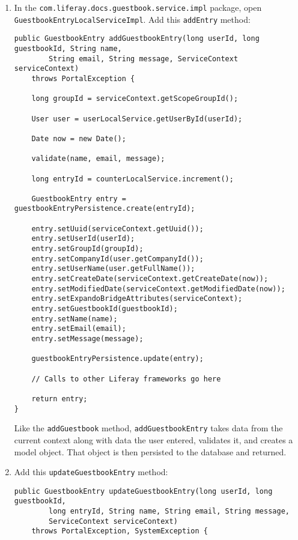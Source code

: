 \begin{enumerate}
\def\labelenumi{\arabic{enumi}.}
\item
  In the \texttt{com.liferay.docs.guestbook.service.impl} package, open
  \texttt{GuestbookEntryLocalServiceImpl}. Add this \texttt{addEntry}
  method:

\begin{verbatim}
public GuestbookEntry addGuestbookEntry(long userId, long guestbookId, String name,
        String email, String message, ServiceContext serviceContext)
    throws PortalException {

    long groupId = serviceContext.getScopeGroupId();

    User user = userLocalService.getUserById(userId);

    Date now = new Date();

    validate(name, email, message);

    long entryId = counterLocalService.increment();

    GuestbookEntry entry = guestbookEntryPersistence.create(entryId);

    entry.setUuid(serviceContext.getUuid());
    entry.setUserId(userId);
    entry.setGroupId(groupId);
    entry.setCompanyId(user.getCompanyId());
    entry.setUserName(user.getFullName());
    entry.setCreateDate(serviceContext.getCreateDate(now));
    entry.setModifiedDate(serviceContext.getModifiedDate(now));
    entry.setExpandoBridgeAttributes(serviceContext);
    entry.setGuestbookId(guestbookId);
    entry.setName(name);
    entry.setEmail(email);
    entry.setMessage(message);

    guestbookEntryPersistence.update(entry);

    // Calls to other Liferay frameworks go here

    return entry;
}
\end{verbatim}

  Like the \texttt{addGuestbook} method, \texttt{addGuestbookEntry}
  takes data from the current context along with data the user entered,
  validates it, and creates a model object. That object is then
  persisted to the database and returned.
\item
  Add this \texttt{updateGuestbookEntry} method:

\begin{verbatim}
public GuestbookEntry updateGuestbookEntry(long userId, long guestbookId,
        long entryId, String name, String email, String message,
        ServiceContext serviceContext)
    throws PortalException, SystemException {


\end{verbatim}
\end{enumerate}
